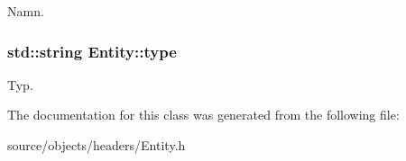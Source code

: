 Namn. 

\hypertarget{classEntity_a298a9ebf2474bb00874b5ff6a0d637ef}{
\subsubsection[{type}]{\setlength{\rightskip}{0pt plus 5cm}std\+::string Entity\+::type\hspace{0.3cm}{\ttfamily [protected]}}}\label{classEntity_a298a9ebf2474bb00874b5ff6a0d637ef}


Typ. 



The documentation for this class was generated from the following file\+:\begin{DoxyCompactItemize}
\item 
source/objects/headers/Entity.\+h\end{DoxyCompactItemize}
